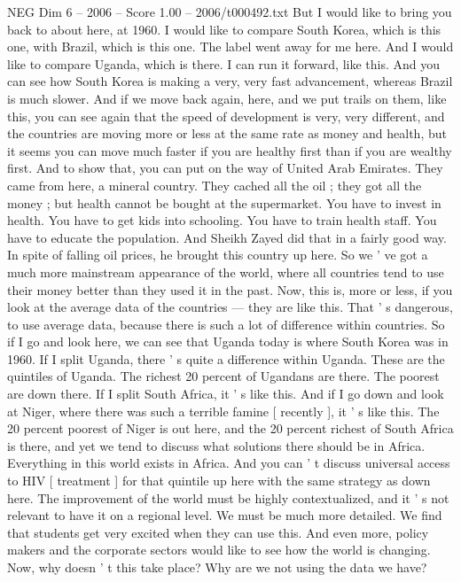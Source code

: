 \begin{textsample}{NEG Dim 6 – 2006 – Score 1.00 – 2006/t000492.txt}
But I would like to bring you back to about here, at 1960.
I would like to compare South Korea, which is this one, with Brazil, which is this one.
The label went away for me here.
And I would like to compare Uganda, which is there.
I can run it forward, like this.
And you can see how South Korea is making a very, very fast advancement, whereas Brazil is much slower.
And if we move back again, here, and we put trails on them, like this, you can see again that the speed of development is very, very different, and the countries are moving more or less at the same rate as money and health, but it seems you can move much faster if you are healthy first than if you are wealthy first.
And to show that, you can put on the way of United Arab Emirates.
They came from here, a mineral country.
They cached all the oil ; they got all the money ; but health cannot be bought at the supermarket.
You have to invest in health.
You have to get kids into schooling.
You have to train health staff.
You have to educate the population.
And Sheikh Zayed did that in a fairly good way.
In spite of falling oil prices, he brought this country up here.
So we ' ve got a much more mainstream appearance of the world, where all countries tend to use their money better than they used it in the past.
Now, this is, more or less, if you look at the average data of the countries — they are like this.
That ' s dangerous, to use average data, because there is such a lot of difference within countries.
So if I go and look here, we can see that Uganda today is where South Korea was in 1960.
If I split Uganda, there ' s quite a difference within Uganda.
These are the quintiles of Uganda.
The richest 20 percent of Ugandans are there.
The poorest are down there.
If I split South Africa, it ' s like this.
And if I go down and look at Niger, where there was such a terrible famine [ recently ], it ' s like this.
The 20 percent poorest of Niger is out here, and the 20 percent richest of South Africa is there, and yet we tend to discuss what solutions there should be in Africa.
Everything in this world exists in Africa.
And you can ' t discuss universal access to HIV [ treatment ] for that quintile up here with the same strategy as down here.
The improvement of the world must be highly contextualized, and it ' s not relevant to have it on a regional level.
We must be much more detailed.
We find that students get very excited when they can use this.
And even more, policy makers and the corporate sectors would like to see how the world is changing.
Now, why doesn ' t this take place?
Why are we not using the data we have?

\end{textsample}
